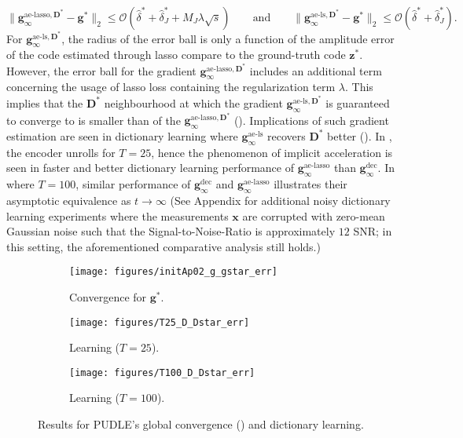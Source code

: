 \documentclass[10pt]{article} %
\newcommand{\D}{{\bm D}}
\newcommand{\x}{{\bm x}}
\newcommand{\z}{{\bm z}}
\newcommand{\g}{{\bm g}}
\begin{document}
\begin{equation}
\| \g_{\infty}^{\text{ae-lasso}, \D^{\ast}}  - \g^{\ast} \|_2 \leq  \mathcal{O}(\hat \delta^{\ast} + \hat \delta_J^{\ast} + M_J \lambda \sqrt{s})
\qquad \text{and}\qquad
\| \g_{\infty}^{\text{ae-ls}, \D^{\ast}}  -  \g^{\ast} \|_2 \leq \mathcal{O}(\hat \delta^{\ast} + \hat \delta_J^{\ast}).
\end{equation}
For $\g_{\infty}^{\text{ae-ls}, \D^{\ast}}$, the radius of the error ball is only a function of the amplitude error of the code estimated through lasso compare to the ground-truth code $\z^{\ast}$. However, the error ball for the gradient $\g_{\infty}^{\text{ae-lasso}, \D^{\ast}}$ includes an additional term concerning the usage of lasso loss containing the regularization term $\lambda$. This implies that the $\D^{\ast}$ neighbourhood at which the gradient $\g_{\infty}^{\text{ae-ls}, \D^{\ast}}$ is guaranteed to converge to is smaller than of the $\g_{\infty}^{\text{ae-lasso}, \D^{\ast}}$ (). Implications of such gradient estimation are seen in dictionary learning where $\g_{\infty}^{\text{ae-ls}}$ recovers $\D^{\ast}$ better (). In , the encoder unrolls for $T=25$, hence the phenomenon of implicit acceleration is seen in faster and better dictionary learning performance of $\g_{\infty}^{\text{ae-lasso}}$ than $\g_{\infty}^{\text{dec}}$. In  where $T=100$, similar performance of $\g_{\infty}^{\text{dec}}$ and $\g_{\infty}^{\text{ae-lasso}}$ illustrates their asymptotic equivalence as $t \to \infty$ (See Appendix for additional noisy dictionary learning experiments where the measurements $\x$ are corrupted with zero-mean Gaussian noise such that the Signal-to-Noise-Ratio is approximately $12$ SNR; in this setting, the aforementioned comparative analysis still holds.)
%
\begin{figure}[h]
	\centering
	\begin{subfigure}[t]{0.28\linewidth}
	\centering
	\texttt{[image: figures/initAp02\_g\_gstar\_err]}
	  \caption{Convergence for $\g^{\ast}$.}
  	\label{fig:dstar}
	\end{subfigure}
	\begin{subfigure}[t]{0.28\linewidth}
	\centering
	\texttt{[image: figures/T25\_D\_Dstar\_err]}
	  \caption{Learning ($T=25$).}
  	\label{fig:dl_25}
	\end{subfigure}
	\begin{subfigure}[t]{0.28\linewidth}
	\centering
	\texttt{[image: figures/T100\_D\_Dstar\_err]}
	  \caption{Learning ($T=100$).}
  	\label{fig:dl_100}
	\end{subfigure}
	\caption{Results for PUDLE's global convergence () and dictionary learning.}
	\label{fig:globalgradient}
	\vspace{-4mm}
\end{figure}
%
\end{document}
